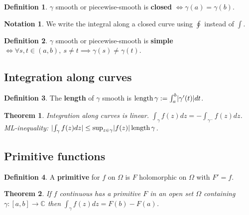 \documentclass[12pt]{article}
\newtheorem{thm}{Theorem}[section]
\theoremstyle{definition}
\newtheorem{defn}{Definition}[section]
\newtheorem*{not*}{Notation}
\newcommand{\C}{\mathbb{C}}
\DeclarePairedDelimiter\abs{\lvert}{\rvert}
\DeclareMathOperator{\length}{length}
\begin{document}
\begin{defn}
  $\gamma$ smooth or piecewise-smooth is \textbf{closed} $\iff \gamma(a) = \gamma(b)$.
\end{defn}

\begin{not*}
  We write the integral along a closed curve using $\oint$ instead of $\int$.
\end{not*}

\begin{defn}
  $\gamma$ smooth or piecewise-smooth is \textbf{simple} $\iff \forall s, t \in (a, b),\ s \neq t \implies \gamma(s) \neq \gamma(t)$.
\end{defn}


\subsection{Integration along curves}

\begin{defn}
  The \textbf{length} of $\gamma$ smooth is $\length{\gamma} := \int_a^b\abs{\gamma'(t)}dt$.
\end{defn}

\begin{thm}
  Integration along curves is linear.
  $\int_{\gamma}f(z)dz = -\int_{\gamma^-}f(z)dz$.
  ML-inequality: $\abs{\int_{\gamma}f(z)dz} \leq \sup_{z \in \gamma}\abs{f(z)}\length{\gamma}$.
\end{thm}


\subsection{Primitive functions}

\begin{defn}
  A \textbf{primitive} for $f$ on $\Omega$ is $F$ holomorphic on $\Omega$ with $F' = f$.
\end{defn}

\begin{thm}
  If $f$ continuous has a primitive $F$ in an open set $\Omega$ containing $\gamma : [a, b] \to \C$ then $\int_{\gamma}f(z)dz = F(b) - F(a)$.
\end{thm}
\end{document}
